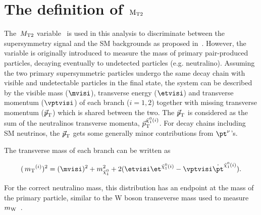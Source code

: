 \section{\texorpdfstring{The definition of $\rm {\ensuremath{\,{M_{\rm T2}}}}$}{The definition of MT2}}
\label{sect:mt2def}
The $\,{M_{\rm T2}}$ variable~\cite{Lester:1999tx,Barr:2003rg} is used in this analysis to discriminate between the supersymmetry signal and the SM backgrounds as proposed in~\cite{Barr:2009wu}. However, the variable is originally introduced to measure the mass of primary pair-produced particles, decaying eventually to undetected particles (e.g. neutralino). Assuming the two primary supersymmetric particles undergo the same decay chain with visible and undetectable particles in the final state, the system can be described by the visible mass ($\mvisi$), transverse energy ($\etvisi$) and transverse momentum ($\vptvisi$) of each branch ($i=1,2$) together with missing transverse momentum (${\displaystyle{\not}\vec{p}}_{\rm T}$) which is shared between the two. The ${\displaystyle{\not}\vec{p}}_{\rm T}$ is considered as the sum of the neutralinos transverse momenta, $\vec{p}_{\rm T}^{\tilde{\chi}^{0}_1(i)}$. For decay chains including SM neutrinos, the ${\displaystyle{\not}\vec{p}}_{\rm T}$ gets some generally minor contributions from $\pt^{\nu}$'s.

The transverse mass of each branch can be written as 
\begin{linenomath}
\begin{equation}
\label{eq:mtdef}
(\mt^{(i)})^{2}= (\mvisi)^2+m^2_{\neutralino}+2(\etvisi\et^{\neutralino(i)}-\vptvisi\dot\pt^{\neutralino(i)}).
\end{equation}
\end{linenomath}
For the correct neutralino mass, this distribution has an endpoint at the mass of the primary particle, similar to the W boson transeverse mass used to measure $m_{\rm W}$~\cite{Arnison:1983rp,Banner:1983jy,Affolder:2000bpa,Abazov:2002bu}. 

